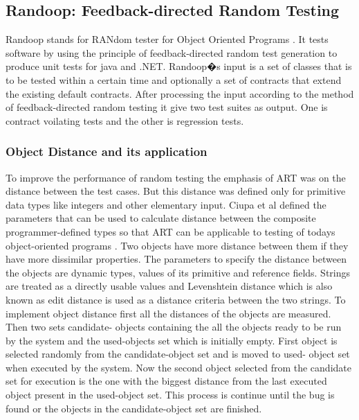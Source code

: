 \subsection{Randoop: Feedback-directed Random Testing}
Randoop stands for RANdom tester for Object Oriented Programs \cite{Pacheco2007b}. It tests software by using the principle of feedback-directed random test generation to produce unit tests for java and .NET. Randoop�s input is a set of classes that is to be tested within a certain time and optionally a set of contracts that extend the existing default contracts. After processing the input according to the method of feedback-directed random testing it give two test suites as output. One is contract voilating tests and the other is regression tests.




\subsubsection{Object Distance and its application}
To improve the performance of random testing the emphasis of ART was on the distance between the test cases. But this distance was defined only for primitive data types like integers and other elementary input. Ciupa et al defined the parameters that can be used to calculate distance between the composite programmer-defined types so that ART can be applicable to testing of todays object-oriented programs \cite{Ciupa2006}. Two objects have more distance between them if they have more dissimilar properties.
The parameters to specify the distance between the objects are dynamic types, values of its primitive and reference fields. Strings are treated as a directly usable values and Levenshtein distance \cite{Levenshtein1966} which is also known as edit distance is used as a distance criteria between the two strings.
To implement object distance first all the distances of the objects are measured. Then two sets candidate- objects containing the all the objects ready to be run by the system and the used-objects set which is initially empty. First object is selected randomly from the candidate-object set and is moved to used- object set when executed by the system. Now the second object selected from the candidate set for execution is the one with the biggest distance from the last executed object present in the used-object set. This process is continue until the bug is found or the objects in the candidate-object set are finished.

